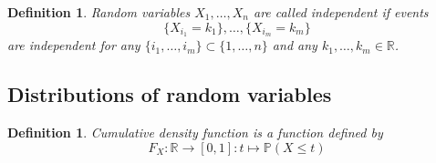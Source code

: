 \documentclass[12pt]{article}
\newtheorem{definition}[theorem]{Definition}
\begin{document}
\begin{definition} Random variables $X_1,\ldots,X_n$ are called independent if events
$$
\{X_{i_1}=k_1\},\ldots,\{X_{i_m}=k_m\}
$$
are independent for any $\{i_1,\ldots,i_m\}\subset\{1,\ldots,n\}$ and any $k_1,\ldots,k_m\in\mathbb{R}$.
\end{definition}


\subsection{Distributions of random variables}

\begin{definition} Cumulative density function is a function defined by
$$
F_X:\mathbb{R}\to [0,1]: t\mapsto \mathbb{P}(X\leq t)
$$
\end{definition}
\end{document}
